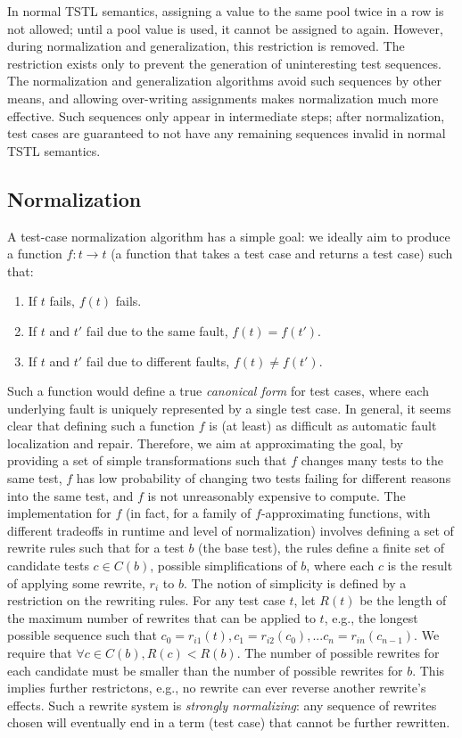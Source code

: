 In normal TSTL semantics, assigning a
value to the same pool twice in a row is not allowed; until a pool
value is used, it cannot be assigned to again.  However, during
normalization and generalization, this restriction is removed.  The
restriction exists only to prevent the generation of uninteresting
test sequences.  The normalization and generalization algorithms avoid
such sequences by other means, and allowing over-writing assignments
makes normalization much more effective.  Such sequences only appear
in intermediate steps; after normalization, test
cases are guaranteed to not have any remaining sequences invalid in
normal TSTL semantics.

\subsection{Normalization}

A test-case normalization algorithm has a simple goal:  we ideally aim to
produce a function $f : t \rightarrow t$ (a function that takes a test
case and returns a test case) such that:

\begin{enumerate}
\item If $t$ fails, $f(t)$ fails.
\item If $t$ and $t'$ fail due to the same fault, $f(t) = f(t')$.
\item If $t$ and $t'$ fail due to different faults, $f(t) \not=
  f(t')$.
\end{enumerate}

Such a function would define a true \emph{canonical form} for test cases, where
each underlying fault is uniquely represented by a single test case.
In general, it seems clear that defining such a function $f$ is (at least) as
difficult as automatic fault localization and repair.  Therefore, we
aim at approximating the goal, by providing a set of simple
transformations such that $f$ changes many tests to the same test, $f$
has
low probability of changing two tests failing for different reasons
into the same test, and $f$ is not unreasonably expensive to compute.
The implementation for $f$ (in fact, for a family of $f$-approximating
functions, with different tradeoffs in runtime and level of
normalization) involves defining a set of rewrite rules such that for a
test $b$ (the base test), the rules define a finite set of candidate
tests $c \in C(b)$, possible simplifications of $b$, where each $c$ is
the result of applying some rewrite, $r_i$ to $b$.  The notion of
simplicity is defined by a restriction on the rewriting rules.  For
any test case $t$, let $R(t)$ be the length of the maximum number of
rewrites that can be applied to $t$, e.g., the longest possible
sequence such that $c_0 = r_{i1}(t), c_1 = r_{i2}(c_0), ... c_n = r_{in}(c_{n-1})$. We
require that $\forall c \in C(b), R(c) < R(b)$.  The number of possible
rewrites for each candidate must be smaller than the number of
possible rewrites for $b$.  This implies further restrictons, e.g., no
rewrite can ever reverse another rewrite's effects.  Such a rewrite
system is \emph{strongly normalizing}:  any sequence of rewrites
chosen will eventually end in a term (test case) that cannot be
further rewritten.

